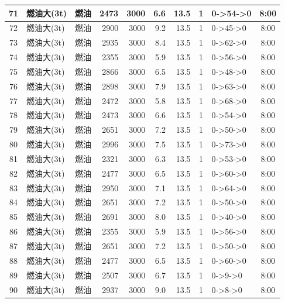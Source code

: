 \begin{landscape}
\begin{longtable}{|c|l|c|r|r|r|r|c|p{2.8cm}|c|}
\hline
\rowcolor{gray!8}
71 & 燃油大(3t) & 燃油 & 2473 & 3000 & 6.6 & 13.5 & 1 & 0->54->0 & 8:00 \\
\hline
72 & 燃油大(3t) & 燃油 & 2900 & 3000 & 9.2 & 13.5 & 1 & 0->45->0 & 8:00 \\
\hline
\rowcolor{gray!8}
73 & 燃油大(3t) & 燃油 & 2935 & 3000 & 8.4 & 13.5 & 1 & 0->62->0 & 8:00 \\
\hline
74 & 燃油大(3t) & 燃油 & 2355 & 3000 & 5.9 & 13.5 & 1 & 0->56->0 & 8:00 \\
\hline
\rowcolor{gray!8}
75 & 燃油大(3t) & 燃油 & 2866 & 3000 & 6.5 & 13.5 & 1 & 0->48->0 & 8:00 \\
\hline
76 & 燃油大(3t) & 燃油 & 2898 & 3000 & 7.9 & 13.5 & 1 & 0->63->0 & 8:00 \\
\hline
\rowcolor{gray!8}
77 & 燃油大(3t) & 燃油 & 2472 & 3000 & 5.8 & 13.5 & 1 & 0->68->0 & 8:00 \\
\hline
78 & 燃油大(3t) & 燃油 & 2473 & 3000 & 6.6 & 13.5 & 1 & 0->54->0 & 8:00 \\
\hline
\rowcolor{gray!8}
79 & 燃油大(3t) & 燃油 & 2651 & 3000 & 7.2 & 13.5 & 1 & 0->50->0 & 8:00 \\
\hline
80 & 燃油大(3t) & 燃油 & 2996 & 3000 & 7.5 & 13.5 & 1 & 0->73->0 & 8:00 \\
\hline
\rowcolor{gray!8}
81 & 燃油大(3t) & 燃油 & 2321 & 3000 & 6.3 & 13.5 & 1 & 0->53->0 & 8:00 \\
\hline
82 & 燃油大(3t) & 燃油 & 2477 & 3000 & 6.5 & 13.5 & 1 & 0->60->0 & 8:00 \\
\hline
\rowcolor{gray!8}
83 & 燃油大(3t) & 燃油 & 2950 & 3000 & 7.1 & 13.5 & 1 & 0->64->0 & 8:00 \\
\hline
84 & 燃油大(3t) & 燃油 & 2651 & 3000 & 7.2 & 13.5 & 1 & 0->50->0 & 8:00 \\
\hline
\rowcolor{gray!8}
85 & 燃油大(3t) & 燃油 & 2691 & 3000 & 8.0 & 13.5 & 1 & 0->40->0 & 8:00 \\
\hline
86 & 燃油大(3t) & 燃油 & 2355 & 3000 & 5.9 & 13.5 & 1 & 0->56->0 & 8:00 \\
\hline
\rowcolor{gray!8}
87 & 燃油大(3t) & 燃油 & 2651 & 3000 & 7.2 & 13.5 & 1 & 0->50->0 & 8:00 \\
\hline
88 & 燃油大(3t) & 燃油 & 2477 & 3000 & 6.5 & 13.5 & 1 & 0->60->0 & 8:00 \\
\hline
\rowcolor{gray!8}
89 & 燃油大(3t) & 燃油 & 2507 & 3000 & 6.7 & 13.5 & 1 & 0->9->0 & 8:00 \\
\hline
90 & 燃油大(3t) & 燃油 & 2937 & 3000 & 9.0 & 13.5 & 1 & 0->8->0 & 8:00 \\

\end{longtable}
\end{landscape}
